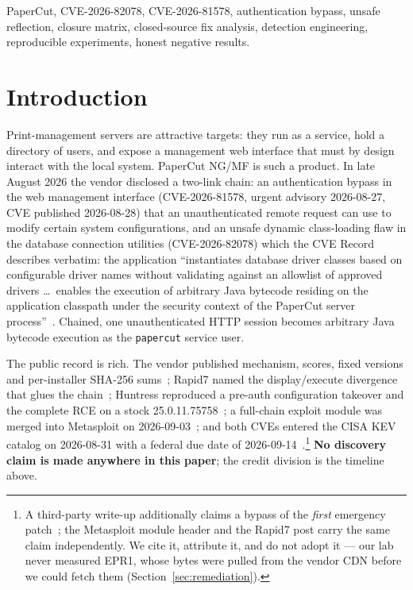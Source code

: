 \documentclass[journal]{IEEEtran}
\begin{document}
\begin{IEEEkeywords}
PaperCut, CVE-2026-82078, CVE-2026-81578, authentication bypass, unsafe
reflection, closure matrix, closed-source fix analysis, detection engineering,
reproducible experiments, honest negative results.
\end{IEEEkeywords}

\section{Introduction}
\label{sec:intro}

Print-management servers are attractive targets: they run as a service, hold a
directory of users, and expose a management web interface that must by design
interact with the local system. PaperCut NG/MF is such a product. In late
August 2026 the vendor disclosed a two-link chain: an authentication bypass in
the web management interface (CVE-2026-81578, urgent advisory 2026-08-27, CVE
published 2026-08-28) that an unauthenticated remote request can use to modify
certain system configurations, and an unsafe dynamic class-loading flaw in the
database connection utilities (CVE-2026-82078) which the CVE Record describes
verbatim: the application ``instantiates database driver classes based on
configurable driver names without validating against an allowlist of approved
drivers \ldots\ enables the execution of arbitrary Java bytecode residing on
the application classpath under the security context of the PaperCut server
process''~\cite{cve82078}. Chained, one unauthenticated HTTP session becomes
arbitrary Java bytecode execution as the \texttt{papercut} service user.

The public record is rich. The vendor published mechanism, scores, fixed
versions and per-installer SHA-256 sums~\cite{advisory}; Rapid7 named the
display/execute divergence that glues the chain~\cite{r7}; Huntress reproduced
a pre-auth configuration takeover and the complete RCE on a stock
25.0.11.75758~\cite{huntress}; a full-chain exploit module was merged into
Metasploit on 2026-09-03~\cite{msf}; and both CVEs entered the CISA KEV catalog
on 2026-08-31 with a federal due date of
2026-09-14~\cite{kev}.\footnote{A third-party write-up additionally claims a
bypass of the \emph{first} emergency patch~\cite{techanarchy}; the Metasploit
module header and the Rapid7 post carry the same claim independently. We cite
it, attribute it, and do not adopt it — our lab never measured EPR1, whose
bytes were pulled from the vendor CDN before we could fetch them
(Section~\ref{sec:remediation}).} \textbf{No discovery claim is made anywhere
in this paper}; the credit division is the timeline above.
\end{document}
